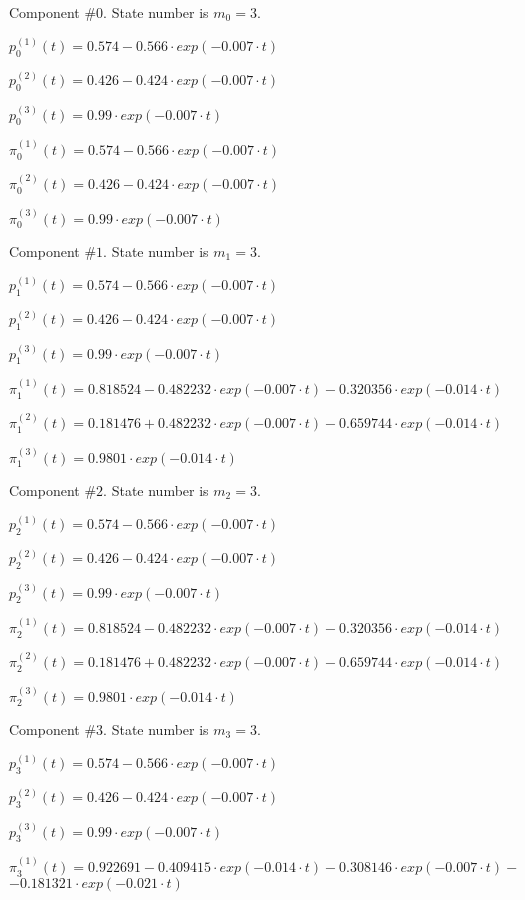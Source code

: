 

 Component #$0$. State number is $m_0=3$.

 $p^{(1)}_0(t)=0.574-0.566\cdot exp(-0.007\cdot t)$

 $p^{(2)}_0(t)=0.426-0.424\cdot exp(-0.007\cdot t)$

 $p^{(3)}_0(t)=0.99\cdot exp(-0.007\cdot t)$

 $\pi^{(1)}_0(t)=0.574-0.566\cdot exp(-0.007\cdot t)$

 $\pi^{(2)}_0(t)=0.426-0.424\cdot exp(-0.007\cdot t)$

 $\pi^{(3)}_0(t)=0.99\cdot exp(-0.007\cdot t)$

 Component #$1$. State number is $m_1=3$.

 $p^{(1)}_1(t)=0.574-0.566\cdot exp(-0.007\cdot t)$

 $p^{(2)}_1(t)=0.426-0.424\cdot exp(-0.007\cdot t)$

 $p^{(3)}_1(t)=0.99\cdot exp(-0.007\cdot t)$

 $\pi^{(1)}_1(t)=0.818524-0.482232\cdot exp(-0.007\cdot t)-0.320356\cdot exp(-0.014\cdot t)$

 $\pi^{(2)}_1(t)=0.181476+0.482232\cdot exp(-0.007\cdot t)-0.659744\cdot exp(-0.014\cdot t)$

 $\pi^{(3)}_1(t)=0.9801\cdot exp(-0.014\cdot t)$

 Component #$2$. State number is $m_2=3$.

 $p^{(1)}_2(t)=0.574-0.566\cdot exp(-0.007\cdot t)$

 $p^{(2)}_2(t)=0.426-0.424\cdot exp(-0.007\cdot t)$

 $p^{(3)}_2(t)=0.99\cdot exp(-0.007\cdot t)$

 $\pi^{(1)}_2(t)=0.818524-0.482232\cdot exp(-0.007\cdot t)-0.320356\cdot exp(-0.014\cdot t)$

 $\pi^{(2)}_2(t)=0.181476+0.482232\cdot exp(-0.007\cdot t)-0.659744\cdot exp(-0.014\cdot t)$

 $\pi^{(3)}_2(t)=0.9801\cdot exp(-0.014\cdot t)$

 Component #$3$. State number is $m_3=3$.

 $p^{(1)}_3(t)=0.574-0.566\cdot exp(-0.007\cdot t)$

 $p^{(2)}_3(t)=0.426-0.424\cdot exp(-0.007\cdot t)$

 $p^{(3)}_3(t)=0.99\cdot exp(-0.007\cdot t)$

 $\pi^{(1)}_3(t)=0.922691-0.409415\cdot exp(-0.014\cdot t)-0.308146\cdot exp(-0.007\cdot t)-$
$-0.181321\cdot exp(-0.021\cdot t)$


